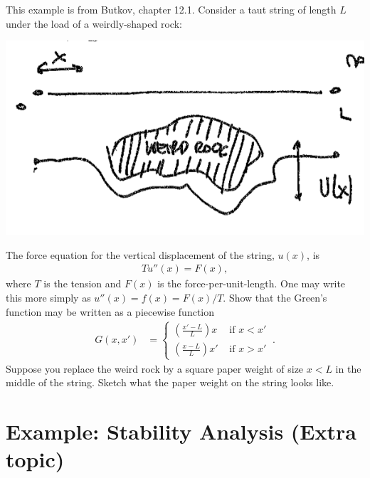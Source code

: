 \begin{exercise}
This example is from Butkov, chapter 12.1. Consider a taut string of length $L$ under the load of a weirdly-shaped rock:
\begin{center}
\includegraphics[width=.5\textwidth]{figures/lec12_eg.png}
\end{center}
The force equation for the vertical displacement of the string, $u(x)$, is
\begin{align}
  T u''(x) = F(x),
\end{align}
where $T$ is the tension and $F(x)$ is the force-per-unit-length. One may write this more simply as $u''(x) = f(x) = F(x)/T$. Show that the Green's function may be written as a piecewise function
\begin{align}
  G(x,x') &=
  \begin{cases}
  \left(\frac{x'-L}{L}\right)x  & \text{ if } x<x'
  \\
  \left(\frac{x-L}{L}\right)x' & \text{ if } x>x' 
  \end{cases}\ .
\end{align}
Suppose you replace the weird rock by a square paper weight of size $x < L$ in the middle of the string. Sketch what the paper weight on the string looks like.
\end{exercise}


\section{Example: Stability Analysis (Extra topic)}

